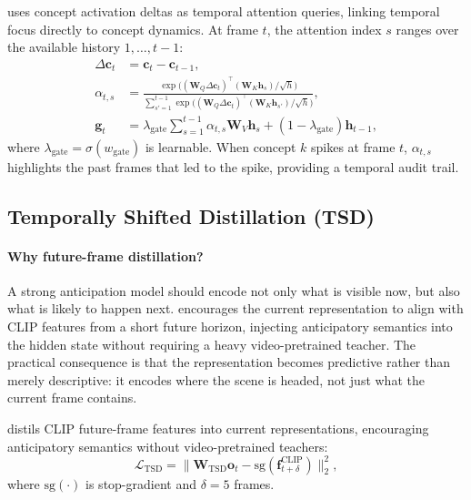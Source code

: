 \cgta{} uses concept activation deltas as temporal attention queries,
linking temporal focus directly to concept dynamics. At frame $t$, the
attention index $s$ ranges over the available history $1,\dots,t-1$:
\begin{align}
  \Delta\mathbf{c}_t &= \mathbf{c}_t - \mathbf{c}_{t-1}, \\
  \alpha_{t,s} &=
    \frac{\exp\bigl((\mathbf{W}_Q\Delta\mathbf{c}_t)^\top
      (\mathbf{W}_K\mathbf{h}_s)/\sqrt{h}\bigr)}
    {\sum_{s'=1}^{t-1}\exp\bigl((\mathbf{W}_Q\Delta\mathbf{c}_t)^\top
      (\mathbf{W}_K\mathbf{h}_{s'})/\sqrt{h}\bigr)}, \\
  \mathbf{g}_t &= \lambda_{\text{gate}}\sum_{s=1}^{t-1}\alpha_{t,s}\mathbf{W}_V\mathbf{h}_s
    + (1-\lambda_{\text{gate}})\mathbf{h}_{t-1},
\end{align}
where $\lambda_{\text{gate}} = \sigma(w_{\text{gate}})$ is learnable.
When concept $k$ spikes at frame $t$, $\alpha_{t,s}$ highlights the past
frames that led to the spike, providing a temporal audit trail.

\subsection{Temporally Shifted Distillation (TSD)}

\paragraph{Why future-frame distillation?}
A strong anticipation model should encode not only what is visible now,
but also what is likely to happen next.
\tsd{} encourages the current representation to align with CLIP features
from a short future horizon, injecting anticipatory semantics into the
hidden state without requiring a heavy video-pretrained teacher.
The practical consequence is that the representation becomes predictive
rather than merely descriptive: it encodes where the scene is headed,
not just what the current frame contains.

\tsd{} distils CLIP future-frame features into current representations,
encouraging anticipatory semantics without video-pretrained teachers:
\begin{equation}
  \mathcal{L}_{\text{TSD}}
  = \bigl\|\mathbf{W}_{\text{TSD}}\mathbf{o}_t
    - \mathrm{sg}(\mathbf{f}^{\text{CLIP}}_{t+\delta})\bigr\|_2^2,
  \label{eq:tsd}
\end{equation}
where $\mathrm{sg}(\cdot)$ is stop-gradient and $\delta{=}5$ frames.

